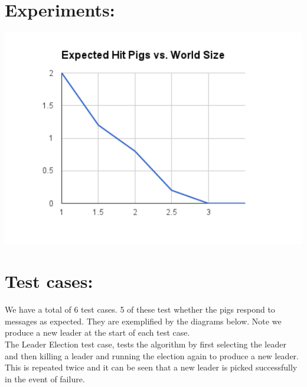 \documentclass[]{article}
\makeatletter
\def\maxwidth{\ifdim\Gin@nat@width>\linewidth\linewidth
\else\Gin@nat@width\fi}
\let\Oldincludegraphics\includegraphics
\renewcommand{\includegraphics}[1]{\Oldincludegraphics[width=\maxwidth]{#1}}
\makeatother
\begin{document}
\section{Experiments:}
\includegraphics{figs/chart_1.pdf}

\pagebreak

\section{Test cases:}
We have a total of 6 test cases. 5 of these test whether the pigs respond to messages as expected. They are exemplified by the diagrams below. Note we produce a new leader at the start of each test case.\\
The Leader Election test case, tests the algorithm by first selecting the leader and then killing a leader and running the election again to produce a new leader. This is repeated twice and it can be seen that a new leader is picked successfully in the event of failure. 
\end{document}
